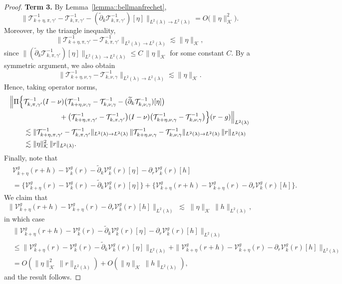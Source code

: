\documentclass[11pt]{article}
\newcommand{\adk}{\widetilde{\partial}_k}
\theoremstyle{plain}
\begin{document}
\begin{proof}
\noindent \textbf{Term 3.} By Lemma~\ref{lemma::bellmanfrechet},
\[
\|\mathcal T_{k+\eta,\pi, \gamma'}^{-1}-\mathcal T_{k,\pi, \gamma'}^{-1}-(\adk\mathcal T_{k,\pi,\gamma'}^{-1})[\eta]\|_{L^2(\lambda)\to L^2(\lambda)}
= O\!\big(\|\eta\|_{\mathcal K}^2\big).
\]
Moreover, by the triangle inequality,
\[
\|\mathcal T_{k+\eta,\pi,\gamma'}^{-1}-\mathcal T_{k,\pi,\gamma'}^{-1}\|_{L^2(\lambda)\to L^2(\lambda)}
\lesssim \|\eta\|_{\mathcal K},
\]
since \(\|(\adk\mathcal T_{k,\pi,\gamma'}^{-1})[\eta]\|_{L^2(\lambda)\to L^2(\lambda)} \le C\,\|\eta\|_{\mathcal K}\) for some constant \(C\). By a symmetric argument, we also obtain
\[
\|\mathcal T_{k+\eta,\nu,\gamma}^{-1}-\mathcal T_{k,\nu,\gamma}^{-1}\|_{L^2(\lambda)\to L^2(\lambda)}
\lesssim \|\eta\|_{\mathcal K}.
\]
Hence, taking operator norms, 
\begin{align*}
&\Big\|\Pi\Big\{\mathcal T_{k,\pi,\gamma'}^{-1}(I-\nu)\big(\mathcal T_{k+\eta,\nu,\gamma}^{-1}-\mathcal T_{k,\nu,\gamma}^{-1}-(\adk \mathcal T_{k,\nu,\gamma}^{-1})[\eta]\big) \\
&\hspace{2.5cm}+ \big(\mathcal T_{k+\eta,\pi,\gamma'}^{-1}-\mathcal T_{k,\pi,\gamma'}^{-1}\big)(I-\nu)\big(\mathcal T_{k+\eta,\nu,\gamma}^{-1}-\mathcal T_{k,\nu,\gamma}^{-1}\big)\Big\}(r-g)\Big\|_{L^2(\lambda)} \\
&\qquad \lesssim \|\mathcal T_{k+\eta,\pi,\gamma'}^{-1}-\mathcal T_{k,\pi,\gamma'}^{-1}\|_{L^2(\lambda)\to L^2(\lambda)} \,
\|\mathcal T_{k+\eta,\nu,\gamma}^{-1}-\mathcal T_{k,\nu,\gamma}^{-1}\|_{L^2(\lambda)\to L^2(\lambda)} \,\|r\|_{L^2(\lambda)} \\
&\qquad \lesssim \|\eta\|_{\mathcal K}^2 \,\|r\|_{L^2(\lambda)}.
\end{align*}
Finally, note that 
\begin{align*}
   & \mathcal{V}_{k+\eta}^g(r+ h) - \mathcal{V}_k^g(r) - \adk \mathcal{V}_k^g(r)[\eta] - \partial_r \mathcal{V}_k^g(r)[h] \\
   &= \Big\{\mathcal{V}_{k+\eta}^g(r) - \mathcal{V}_k^g(r) - \adk \mathcal{V}_k^g(r)[\eta]\Big\} 
      + \Big\{\mathcal{V}_{k+\eta}^g(r+h) - \mathcal{V}_{k+\eta}^g(r) - \partial_r \mathcal{V}_k^g(r)[h]\Big\}.
\end{align*}
We claim that
\[
\|\mathcal{V}_{k+\eta}^g(r+h) - \mathcal{V}_{k+\eta}^g(r) - \partial_r \mathcal{V}_k^g(r)[h]\|_{L^2(\lambda)} \;\lesssim\; \|\eta\|_{\mathcal K}\,\|h\|_{L^2(\lambda)},
\]
in which case
\begin{align*}
   & \|\mathcal{V}_{k+\eta}^g(r+ h) - \mathcal{V}_k^g(r) - \adk \mathcal{V}_k^g(r)[\eta] - \partial_r \mathcal{V}_k^g(r)[h]\|_{L^2(\lambda)} \\
   &\leq \|\mathcal{V}_{k+\eta}^g(r) - \mathcal{V}_k^g(r) - \adk \mathcal{V}_k^g(r)[\eta]\|_{L^2(\lambda)}
      + \|\mathcal{V}_{k+\eta}^g(r+h) - \mathcal{V}_{k+\eta}^g(r) - \partial_r \mathcal{V}_k^g(r)[h]\|_{L^2(\lambda)}\\
   &= O(\|\eta\|_{\mathcal K}^2\,\|r\|_{L^2(\lambda)}) +  O(\|\eta\|_{\mathcal K}\,\|h\|_{L^2(\lambda)}),
\end{align*}
and the result follows.


\end{proof}
\end{document}
